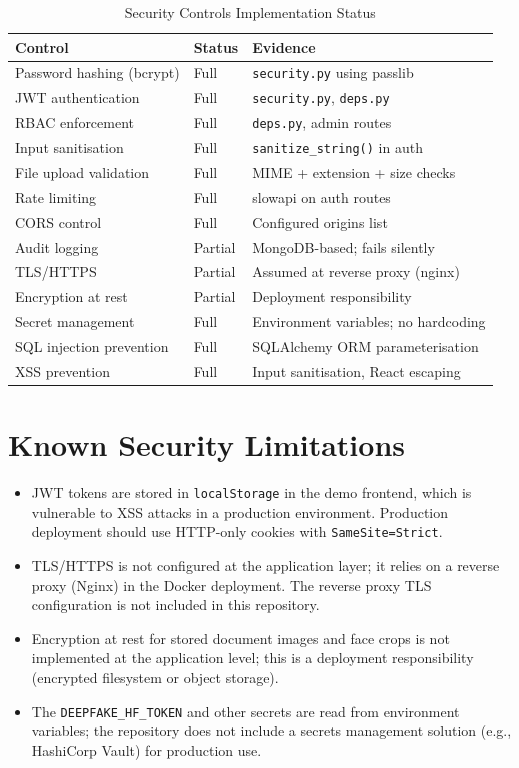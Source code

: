 \begin{table}[H]
\centering
\caption{Security Controls Implementation Status}
\begin{tabular}{@{}p{4cm}p{1.5cm}p{6cm}@{}}
\toprule
\textbf{Control} & \textbf{Status} & \textbf{Evidence} \\
\midrule
Password hashing (bcrypt) & Full & \texttt{security.py} using passlib \\
JWT authentication & Full & \texttt{security.py}, \texttt{deps.py} \\
RBAC enforcement & Full & \texttt{deps.py}, admin routes \\
Input sanitisation & Full & \texttt{sanitize\_string()} in auth \\
File upload validation & Full & MIME + extension + size checks \\
Rate limiting & Full & slowapi on auth routes \\
CORS control & Full & Configured origins list \\
Audit logging & Partial & MongoDB-based; fails silently \\
TLS/HTTPS & Partial & Assumed at reverse proxy (nginx) \\
Encryption at rest & Partial & Deployment responsibility \\
Secret management & Full & Environment variables; no hardcoding \\
SQL injection prevention & Full & SQLAlchemy ORM parameterisation \\
XSS prevention & Full & Input sanitisation, React escaping \\
\bottomrule
\end{tabular}
\end{table}

\section{Known Security Limitations}

\begin{itemize}
    \item JWT tokens are stored in \texttt{localStorage} in the demo frontend, which is vulnerable to XSS attacks in a production environment. Production deployment should use HTTP-only cookies with \texttt{SameSite=Strict}.
    \item TLS/HTTPS is not configured at the application layer; it relies on a reverse proxy (Nginx) in the Docker deployment. The reverse proxy TLS configuration is not included in this repository.
    \item Encryption at rest for stored document images and face crops is not implemented at the application level; this is a deployment responsibility (encrypted filesystem or object storage).
    \item The \texttt{DEEPFAKE\_HF\_TOKEN} and other secrets are read from environment variables; the repository does not include a secrets management solution (e.g., HashiCorp Vault) for production use.
\end{itemize}

